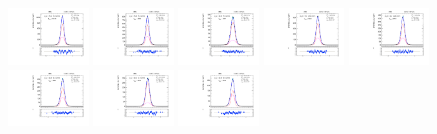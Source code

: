 \begin{figure}[htb]
\includegraphics[width=0.19\textwidth]{plots/Appendix_Recoil_Fits/ZmmMC_PF_13TeV_2G/pfu1fit_8.pdf}
\includegraphics[width=0.19\textwidth]{plots/Appendix_Recoil_Fits/ZmmMC_PF_13TeV_2G/pfu1fit_9.pdf}
\includegraphics[width=0.19\textwidth]{plots/Appendix_Recoil_Fits/ZmmMC_PF_13TeV_2G/pfu1fit_19.pdf}
\includegraphics[width=0.19\textwidth]{plots/Appendix_Recoil_Fits/ZmmMC_PF_13TeV_2G/pfu1fit_11.pdf}
\includegraphics[width=0.19\textwidth]{plots/Appendix_Recoil_Fits/ZmmMC_PF_13TeV_2G/pfu1fit_12.pdf}
\includegraphics[width=0.19\textwidth]{plots/Appendix_Recoil_Fits/ZmmMC_PF_13TeV_2G/pfu1fit_13.pdf}
\includegraphics[width=0.19\textwidth]{plots/Appendix_Recoil_Fits/ZmmMC_PF_13TeV_2G/pfu1fit_14.pdf}
\includegraphics[width=0.19\textwidth]{plots/Appendix_Recoil_Fits/ZmmMC_PF_13TeV_2G/pfu1fit_15.pdf}

\end{figure}
